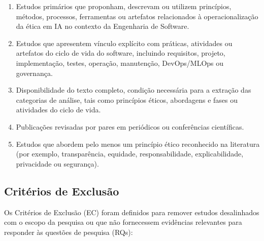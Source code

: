\begin{enumerate}
    \item[(IC1)] Estudos primários que proponham, descrevam ou utilizem princípios, métodos, processos, ferramentas ou artefatos relacionados à operacionalização da ética em IA no contexto da Engenharia de Software.
    
    \item[(IC2)] Estudos que apresentem vínculo explícito com práticas, atividades ou artefatos do ciclo de vida do software, incluindo requisitos, projeto, implementação, testes, operação, manutenção, DevOps/MLOps ou governança.
    
    \item[(IC3)] Disponibilidade do texto completo, condição necessária para a extração das categorias de análise, tais como princípios éticos, abordagens e fases ou atividades do ciclo de vida.
    
    \item[(IC4)] Publicações revisadas por pares em periódicos ou conferências científicas.
    
    \item[(IC5)] Estudos que abordem pelo menos um princípio ético reconhecido na literatura (por exemplo, transparência, equidade, responsabilidade, explicabilidade, privacidade ou segurança).
\end{enumerate}

\subsection{Critérios de Exclusão}

Os Critérios de Exclusão (EC) foram definidos para remover estudos desalinhados com o escopo da pesquisa ou que não fornecessem evidências relevantes para responder às questões de pesquisa (RQs):

